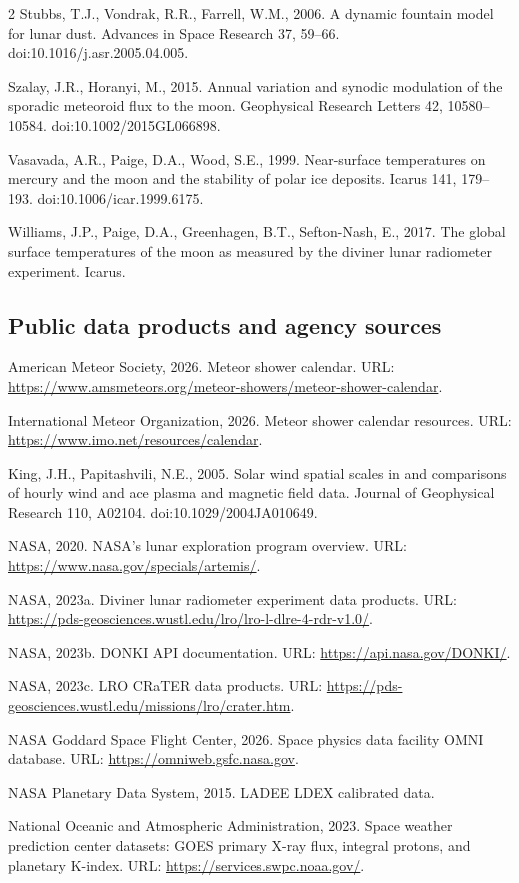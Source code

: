 \begin{multicols}{2}
Stubbs, T.J., Vondrak, R.R., Farrell, W.M., 2006. A dynamic fountain model for lunar dust. Advances in Space Research 37, 59--66. doi:10.1016/j.asr.2005.04.005.

Szalay, J.R., Horanyi, M., 2015. Annual variation and synodic modulation of the sporadic meteoroid flux to the moon. Geophysical Research Letters 42, 10580--10584. doi:10.1002/2015GL066898.

Vasavada, A.R., Paige, D.A., Wood, S.E., 1999. Near-surface temperatures on mercury and the moon and the stability of polar ice deposits. Icarus 141, 179--193. doi:10.1006/icar.1999.6175.

Williams, J.P., Paige, D.A., Greenhagen, B.T., Sefton-Nash, E., 2017. The global surface temperatures of the moon as measured by the diviner lunar radiometer experiment. Icarus.

\subsection*{Public data products and agency sources}
American Meteor Society, 2026. Meteor shower calendar. URL: \url{https://www.amsmeteors.org/meteor-showers/meteor-shower-calendar}.

International Meteor Organization, 2026. Meteor shower calendar resources. URL: \url{https://www.imo.net/resources/calendar}.

King, J.H., Papitashvili, N.E., 2005. Solar wind spatial scales in and comparisons of hourly wind and ace plasma and magnetic field data. Journal of Geophysical Research 110, A02104. doi:10.1029/2004JA010649.

NASA, 2020. NASA's lunar exploration program overview. URL: \url{https://www.nasa.gov/specials/artemis/}.

NASA, 2023a. Diviner lunar radiometer experiment data products. URL: \url{https://pds-geosciences.wustl.edu/lro/lro-l-dlre-4-rdr-v1.0/}.

NASA, 2023b. DONKI API documentation. URL: \url{https://api.nasa.gov/DONKI/}.

NASA, 2023c. LRO CRaTER data products. URL: \url{https://pds-geosciences.wustl.edu/missions/lro/crater.htm}.

NASA Goddard Space Flight Center, 2026. Space physics data facility OMNI database. URL: \url{https://omniweb.gsfc.nasa.gov}.

NASA Planetary Data System, 2015. LADEE LDEX calibrated data.

National Oceanic and Atmospheric Administration, 2023. Space weather prediction center datasets: GOES primary X-ray flux, integral protons, and planetary K-index. URL: \url{https://services.swpc.noaa.gov/}.


\end{multicols}

